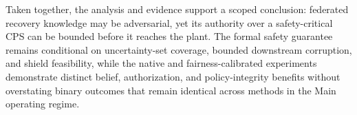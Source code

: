 Taken together, the analysis and evidence support a scoped conclusion: federated recovery knowledge may be adversarial, yet its authority over a safety-critical CPS can be bounded before it reaches the plant. The formal safety guarantee remains conditional on uncertainty-set coverage, bounded downstream corruption, and shield feasibility, while the native and fairness-calibrated experiments demonstrate distinct belief, authorization, and policy-integrity benefits without overstating binary outcomes that remain identical across methods in the Main operating regime.
